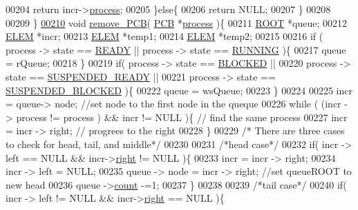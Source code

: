 \begin{DoxyCode}
00204                 \textcolor{keywordflow}{return} incr->\hyperlink{structpage_af3cc0e1320b79159b230f154f1a95f0d}{process};
00205         \}\textcolor{keywordflow}{else}\{
00206                 \textcolor{keywordflow}{return} NULL;
00207         \}
00208 
00209 \}
\hypertarget{mpx__r2_8c_source_l00210}{}\hyperlink{mpx__r2_8c_af30a3658210d449b4b53e5be2ed2bc2e}{00210} \textcolor{keywordtype}{void} \hyperlink{mpx__r2_8c_af30a3658210d449b4b53e5be2ed2bc2e}{remove_PCB}( \hyperlink{structprocess}{PCB} *\hyperlink{structprocess}{process} )\{
00211         \hyperlink{structroot}{ROOT} *queue;
00212         \hyperlink{structpage}{ELEM} *incr;
00213         \hyperlink{structpage}{ELEM} *temp1;
00214         \hyperlink{structpage}{ELEM} *temp2;
00215         
00216         \textcolor{keywordflow}{if} ( process -> state == \hyperlink{mpx__r2_8h_ad1235d5ce36f7267285e82dccd428aa6}{READY} || process -> state == \hyperlink{mpx__r2_8h_a6fb7181d994ee98e735494be55809708}{RUNNING} )\{
00217                 queue = rQueue;
00218         \}
00219         \textcolor{keywordflow}{if}( process -> state == \hyperlink{mpx__r2_8h_a48f6457243719e7031768d4100741159}{BLOCKED} || 
00220                 process -> state == \hyperlink{mpx__r2_8h_a07b1141143e8825b04670da23fca8cc7}{SUSPENDED_READY} || 
00221                 process -> state == \hyperlink{mpx__r2_8h_a6e41bb5a80c5049e8d364bab8ee4d73a}{SUSPENDED_BLOCKED} )\{
00222                 queue = wsQueue;
00223         \}
00224         
00225         incr = queue-> node; \textcolor{comment}{//set node to the first node in the queque}
00226         \textcolor{keywordflow}{while} ( (incr -> process != process ) && incr != NULL )\{ \textcolor{comment}{// find the same
       process}
00227                         incr = incr -> right; \textcolor{comment}{// progrees to the right }
00228         \}
00229         \textcolor{comment}{/* There are three cases to check for head, tail, and middle*/}
00230         
00231         \textcolor{comment}{/*head case*/}
00232         \textcolor{keywordflow}{if}( incr -> left == NULL && incr->\hyperlink{structpage_a59bb1b5eca2d579befcc93a2833f4dfd}{right} != NULL )\{ 
00233                 incr = incr -> right;
00234                 incr -> left  = NULL;
00235                 queue -> node = incr -> right; \textcolor{comment}{//set queueROOT to new head}
00236                 queue ->\hyperlink{structroot_afa78d0408d4af29e936332a04739d59c}{count} -=1;
00237         \}
00238         
00239         \textcolor{comment}{/*tail case*/}
00240         \textcolor{keywordflow}{if}( incr -> left != NULL && incr->\hyperlink{structpage_a59bb1b5eca2d579befcc93a2833f4dfd}{right} == NULL )\{

\end{DoxyCode}
